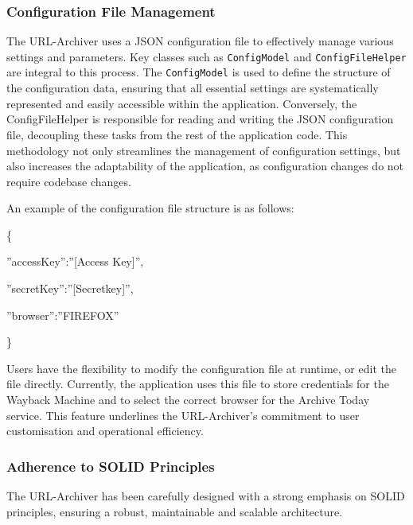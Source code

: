 \subsubsection{Configuration File Management}
The URL-Archiver uses a JSON configuration file to effectively manage various settings and parameters. Key classes such as \texttt{ConfigModel} and \texttt{ConfigFileHelper} are integral to this process. The \texttt{ConfigModel} is used to define the structure of the configuration data, ensuring that all essential settings are systematically represented and easily accessible within the application. Conversely, the ConfigFileHelper is responsible for reading and writing the JSON configuration file, decoupling these tasks from the rest of the application code. This methodology not only streamlines the management of configuration settings, but also increases the adaptability of the application, as configuration changes do not require codebase changes.

An example of the configuration file structure is as follows:

\{

\quad''accessKey'':''[Access Key]'',

\quad''secretKey'':''[Secretkey]'',

\quad''browser'':''FIREFOX''

\}

Users have the flexibility to modify the configuration file at runtime, or edit the file directly. Currently, the application uses this file to store credentials for the Wayback Machine and to select the correct browser for the Archive Today service. This feature underlines the URL-Archiver's commitment to user customisation and operational efficiency.

\subsubsection{Adherence to SOLID Principles}
The URL-Archiver has been carefully designed with a strong emphasis on SOLID principles, ensuring a robust, maintainable and scalable architecture.

